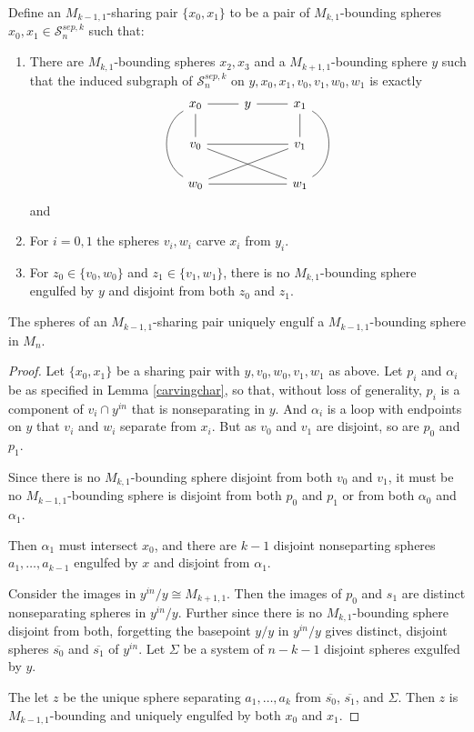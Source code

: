 \begin{definition}
Define an $M_{k-1,1}$-sharing pair
 $\{x_0,x_1\}$
 to be a pair of $M_{k,1}$-bounding spheres $x_0,x_1 \in \mathcal S^{sep,k}_{n}$
such that:
\begin{enumerate}[(1)]
  \item
  There are $M_{k,1}$-bounding spheres $x_2,x_3$ and a
$M_{k+1,1}$-bounding sphere $y$
such that the induced subgraph of $\mathcal S^{sep,k}_{n}$
on $y,x_0,x_1,v_0,v_1,w_0,w_1$ is exactly
$$
\begin{tikzcd}[every arrow/.append style={dash}]
x_0 \arrow{d} \arrow{r} \arrow[bend right=60]{dd}& y \arrow{r}& x_1 \arrow{d} \arrow[bend left=60]{dd}\\
v_0 \arrow{rr} \arrow{rrd}&&  v_1\\
w_0 \arrow{rr} \arrow{rru} &&  w_1
\end{tikzcd}
$$
and
\item For $i=0,1$ the spheres $v_i,w_i$ carve $x_i$ from $y_i$.
\item For $z_0 \in \{v_0,w_0\}$ and $z_1 \in \{v_1,w_1\}$,
there is no $M_{k,1}$-bounding sphere engulfed by $y$ and disjoint from both
$z_0$ and $z_1$.
\end{enumerate}
\label{def:ksharepair}
\end{definition}


\begin{lemma}
  The spheres of an $M_{k-1,1}$-sharing pair
  uniquely engulf a
  $M_{k-1,1}$-bounding sphere in $M_n$.
\end{lemma}

\begin{proof}
Let $\{x_0,x_1\}$ be a sharing pair with $y,v_0,w_0,v_1,w_1$ as above.
Let $p_i$ and $\alpha_i$
be as specified in Lemma \ref{carvingchar},
so that,
without loss of generality,
$p_i$ is a component of $v_i \cap y^{in}$ that is nonseparating in $y$.
And $\alpha_i$ is a loop with endpoints on $y$ that $v_i$ and $w_i$ separate from $x_i$.
But as $v_0$ and $v_1$ are disjoint, so are $p_0$ and $p_1$.

Since there is no $M_{k,1}$-bounding sphere disjoint from
both $v_0$ and $v_1$, it must be no $M_{k-1,1}$-bounding sphere
is disjoint from both $p_0$ and $p_1$ or from both $\alpha_0$ and $\alpha_1$.

Then $\alpha_1$ must intersect $x_0$,
and there are $k-1$
disjoint nonseparting spheres $a_1,\ldots, a_{k-1}$
engulfed by $x$ and disjoint from $\alpha_1$.


Consider the images in $y^{in}/y \cong M_{k+1,1}$.
Then the images of $p_0$ and ${s_1}$
are distinct nonseparating spheres in $y^{in}/y$.
Further since there is no $M_{k,1}$-bounding sphere disjoint from
both, forgetting the basepoint $y/y$ in $y^{in}/y$
gives distinct, disjoint spheres
$\overline{s_0}$ and $\overline{s_1}$ of $y^{in}$.
Let $\Sigma$ be a system of $n-k-1$ disjoint spheres exgulfed by $y$.

The let $z$ be the unique sphere separating
$a_1,\ldots,a_k$ from $\overline{s_0}$, $\overline{s_1}$, and $\Sigma$.
Then $z$ is $M_{k-1,1}$-bounding and
uniquely engulfed by both $x_0$ and $x_1$.
\end{proof}



